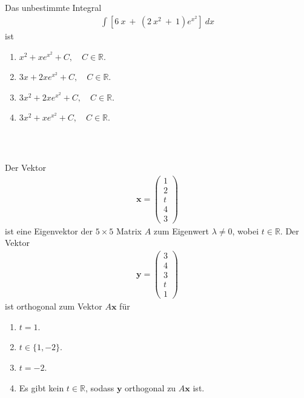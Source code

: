 \subsection*{}
Das unbestimmte Integral
\begin{align*}
\int \left[ 6 \ x \  +  \ (2 \ x^2 \ + \ 1 ) e^{x^2} \right] \ dx
\end{align*}
ist
\renewcommand{\labelenumi}{(\alph{enumi})}
\begin{enumerate}
\item 
$x^2 + x e^{x^2} + C, \quad C \in \mathbb{R}$.
\item
$3x + 2x e^{x^2} + C , \quad C \in \mathbb{R}$.
\item
$3x^2 + 2x e^{x^2} + C , \quad C \in \mathbb{R}$.
\item
$3x^2 + x e^{x^2} + C , \quad C \in \mathbb{R}$.
\end{enumerate}
\ \\
\subsection*{}
Der Vektor
\begin{align*}
\textbf{x}
=
\begin{pmatrix}
1\\
2\\
t\\
4\\
3
\end{pmatrix}
\end{align*}
ist eine Eigenvektor der $5 \times 5$ Matrix $A$ zum Eigenwert $\lambda \neq 0$, wobei $t \in \mathbb{R}$.
Der Vektor
\begin{align*}
\textbf{y}
= 
\begin{pmatrix}
3\\
4\\
3\\
t\\ 
1
\end{pmatrix}
\end{align*}
ist orthogonal zum Vektor $A \textbf{x}$ für
\renewcommand{\labelenumi}{(\alph{enumi})}
\begin{enumerate}
\item 
$t = 1$.
\item
$t \in \lbrace 1, -2 \rbrace$.
\item
$t = -2$.
\item
Es gibt kein $t \in \mathbb{R}$, sodass $\textbf{y}$ orthogonal zu $A \textbf{x} $ ist.
\end{enumerate}
\ \\
